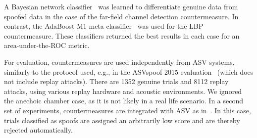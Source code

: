 A Bayesian network classifier~\cite{Pearl1988} was learned to differentiate genuine data from spoofed data in the case of the far-field channel detection countermeasure.  In contrast, the AdaBoost M1 meta classifier~\cite{Freund1999}  was used for the LBP countermeasure.  These classifiers returned the best results in each case for an area-under-the-ROC metric.  %



For evaluation, countermeasures are used independently from ASV systems, similarly to the protocol used, e.g., in the ASVspoof 2015 evaluation~\cite{Wu2015} (which does not include replay attacks).  There are 1352 genuine trials and 8112 replay attacks, using various replay hardware and acoustic environments.  We ignored the anechoic chamber case, as it is not likely in a real life scenario.  In a second set of experiments, countermeasures are integrated with ASV as in~\cite{Alegre2013a}.  In this case, trials classified as spoofs are assigned an arbitrarily low score and are thereby rejected automatically.
